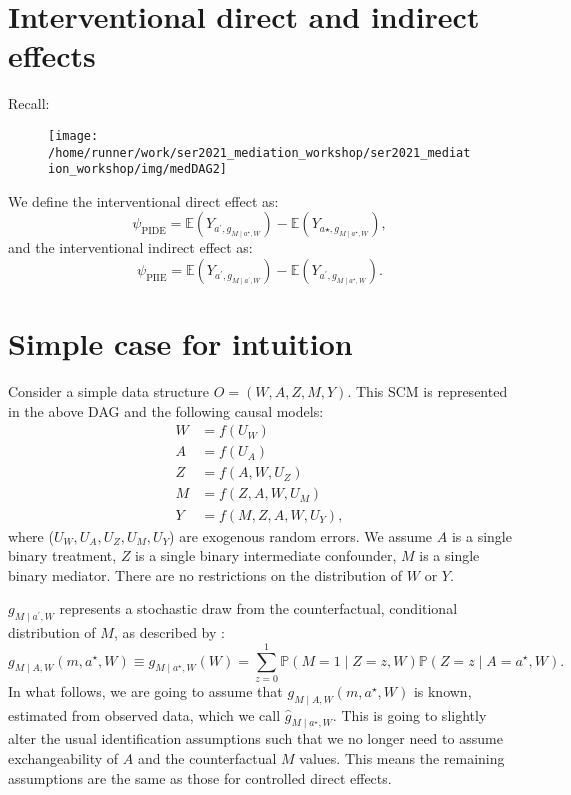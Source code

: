 \documentclass[
  12pt, krantz2,
]{book}
\theoremstyle{definition}
\theoremstyle{definition}
\theoremstyle{definition}
\renewcommand{\P}{\mathbb{P}}
\newcommand{\E}{\mathbb{E}}
\newcommand{\1}{\mathbbm{1}}
\begin{document}
\hypertarget{interventional-direct-and-indirect-effects}{%
\section{Interventional direct and indirect effects}\label{interventional-direct-and-indirect-effects}}

Recall:

\begin{figure}

{\centering \texttt{[image: /home/runner/work/ser2021\_mediation\_workshop/ser2021\_mediation\_workshop/img/medDAG2]} 

}

\end{figure}

We define the interventional direct effect as:
\begin{equation*}
  \psi_{\text{PIDE}} = \E(Y_{a^\prime,g_{M \mid a^\star,W}}) -
    \E(Y_{a\star,g_{M \mid a^\star,W}}),
\end{equation*}
and the interventional indirect effect as:
\begin{equation*}
  \psi_{\text{PIIE}} = \E(Y_{a^\prime,g_{M \mid a^\prime,W}}) -
    \E(Y_{a^\prime,g_{M \mid a^\star,W}}).
\end{equation*}

\hypertarget{simple-case-for-intuition-1}{%
\section{Simple case for intuition}\label{simple-case-for-intuition-1}}

Consider a simple data structure \(O=(W, A, Z, M, Y)\). This SCM is represented in
the above DAG and the following causal models:
\begin{align*}
  W &= f(U_W)\\
  A &= f(U_A)\\
  Z &= f(A, W, U_Z)\\
  M &= f(Z, A, W, U_M)\\
  Y &= f(M, Z, A, W, U_Y),
\end{align*}
where (\(U_W, U_A, U_Z, U_M, U_Y\)) are exogenous random errors. We assume \(A\) is
a single binary treatment, \(Z\) is a single binary intermediate confounder, \(M\)
is a single binary mediator. There are no restrictions on the distribution of
\(W\) or \(Y\).

\(g_{M \mid a^\prime,W}\) represents a stochastic draw from the counterfactual,
conditional distribution of \(M\), as described by
\citet{vanderweele2016mediation}:
\begin{equation*}
  g_{M \mid A,W}(m, a^{\star}, W) \equiv g_{M \mid a^{\star}, W}(W) =
    \sum_{z=0}^1 \P(M=1 \mid Z=z,W) \P(Z=z \mid A=a^{\star}, W).
\end{equation*}
In what follows, we are going to assume that \(g_{M \mid A,W}(m, a^{\star}, W)\)
is known, estimated from observed data, which we call
\(\hat{g}_{M \mid a^{\star}, W}\). This is going to slightly alter the usual
identification assumptions such that we no longer need to assume exchangeability
of \(A\) and the counterfactual \(M\) values. This means the remaining assumptions
are the same as those for controlled direct effects.
\end{document}
